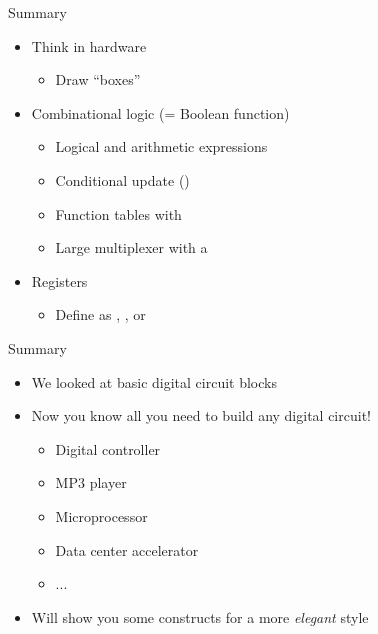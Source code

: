 \begin{frame}[fragile]{Summary}
\begin{itemize}
\item Think in hardware
\begin{itemize}
\item Draw ``boxes''
\end{itemize}
\item Combinational logic (= Boolean function)
\begin{itemize}
\item Logical and arithmetic expressions
\item Conditional update ()
\item Function tables with 
\item Large multiplexer with a 
\end{itemize}
\item Registers
\begin{itemize}
\item Define as , , or 
\end{itemize}
\end{itemize}
\end{frame}

\begin{frame}[fragile]{Summary}
\begin{itemize}
\item We looked at basic digital circuit blocks
\item Now you know all you need to build any digital circuit!
\begin{itemize}
\item Digital controller
\item MP3 player
\item Microprocessor
\item Data center accelerator
\item ...
\end{itemize}
\item Will show you some constructs for a more \emph{elegant} style
\end{itemize}
\end{frame}




